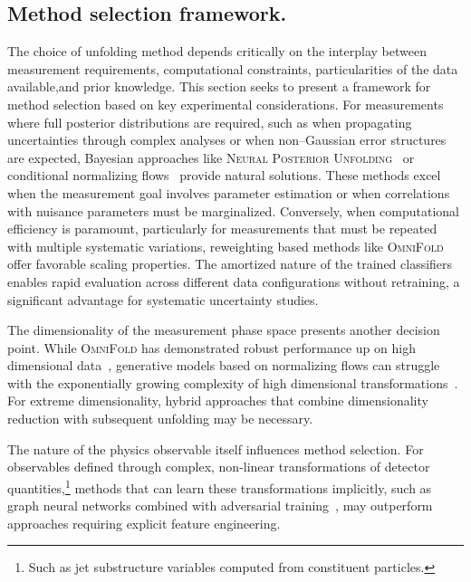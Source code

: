     \subsection{Method selection framework.}
        The choice of unfolding method depends critically on the interplay between measurement requirements, computational constraints, particularities of the data available,and prior knowledge.
        This section seeks to present a framework for method selection based on key experimental considerations.
        For measurements where full posterior distributions are required, such as when propagating uncertainties through complex analyses or when non--Gaussian error structures are expected, Bayesian approaches like \textsc{Neural Posterior Unfolding}~\cite{acosta2024npu} or conditional normalizing flows~\cite{Bellagente2020InvertibleAgain} provide natural solutions.
        These methods excel when the measurement goal involves parameter estimation or when correlations with nuisance parameters must be marginalized.
        Conversely, when computational efficiency is paramount, particularly for measurements that must be repeated with multiple systematic variations, reweighting based methods like \textsc{OmniFold}~\cite{andreassen_omnifold_2020} offer favorable scaling properties.
        The amortized nature of the trained classifiers enables rapid evaluation across different data configurations without retraining, a significant advantage for systematic uncertainty studies.

        The dimensionality of the measurement phase space presents another decision point.
        While \textsc{OmniFold} has demonstrated robust performance up on high dimensional data~\cite{andreassen_omnifold_2020}, generative models based on normalizing flows can struggle with the exponentially growing complexity of high dimensional transformations~\cite{papamakarios_masked_2018}.
        For extreme dimensionality, hybrid approaches that combine dimensionality reduction with subsequent unfolding may be necessary.

        The nature of the physics observable itself influences method selection.
        For observables defined through complex, non-linear transformations of detector quantities,\footnote{Such as jet substructure variables computed from constituent particles.} methods that can learn these transformations implicitly, such as graph neural networks combined with adversarial training~\cite{Shlomi2020GraphPhysics}, may outperform approaches requiring explicit feature engineering.
